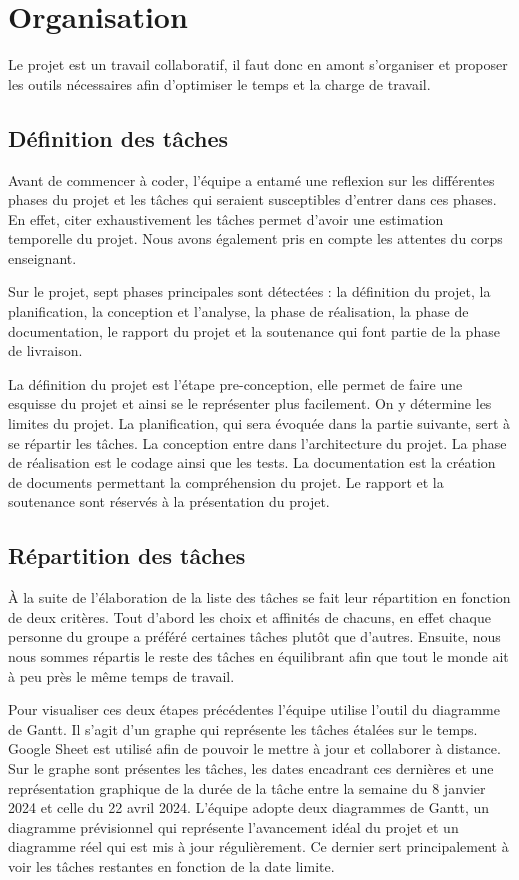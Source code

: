\documentclass[a4paper,12pt]{article}
\begin{document}
\newpage
\section{Organisation}
Le projet est un travail collaboratif, il faut donc en amont s’organiser et proposer les outils nécessaires afin d’optimiser le temps et la charge de travail.

\subsection{Définition des tâches}
Avant de commencer à coder, l’équipe a entamé une reflexion sur les différentes phases du projet et les tâches qui seraient susceptibles d’entrer dans ces phases. 
En effet, citer exhaustivement les tâches permet d’avoir une estimation temporelle du projet. 
Nous avons également pris en compte les attentes du corps enseignant.

Sur le projet, sept phases principales sont détectées : la définition du projet, la planification, la conception et l'analyse, la phase de réalisation, la phase de documentation, le rapport du projet et la soutenance qui font partie de la phase de livraison.

La définition du projet est l’étape pre-conception, elle permet de faire une esquisse du projet et ainsi se le représenter plus facilement. 
On y détermine les limites du projet. 
La planification, qui sera évoquée dans la partie suivante, sert à se répartir les tâches. 
La conception entre dans l’architecture du projet.
La phase de réalisation est le codage ainsi que les tests. 
La documentation est la création de documents permettant la compréhension du projet. 
Le rapport et la soutenance sont réservés à la présentation du projet.

\subsection{Répartition des tâches}
À la suite de l’élaboration de la liste des tâches se fait leur répartition en fonction de deux critères. 
Tout d’abord les choix et affinités de chacuns, en effet chaque personne du groupe a préféré certaines tâches plutôt que d’autres. 
Ensuite, nous nous sommes répartis le reste des tâches en équilibrant afin que tout le monde ait à peu près le même temps de travail.

Pour visualiser ces deux étapes précédentes l’équipe utilise l'outil du diagramme de Gantt. 
Il s’agit d’un graphe qui représente les tâches étalées sur le temps. 
Google Sheet est utilisé afin de pouvoir le mettre à jour et collaborer à distance.
Sur le graphe sont présentes les tâches, les dates encadrant ces dernières et une représentation graphique de la durée de la tâche entre la semaine du 8 janvier 2024 et celle du 22 avril 2024.
L’équipe adopte deux diagrammes de Gantt, un diagramme prévisionnel qui représente l’avancement idéal du projet et un diagramme réel qui est mis à jour régulièrement. 
Ce dernier sert principalement à voir les tâches restantes en fonction de la date limite.
\end{document}
